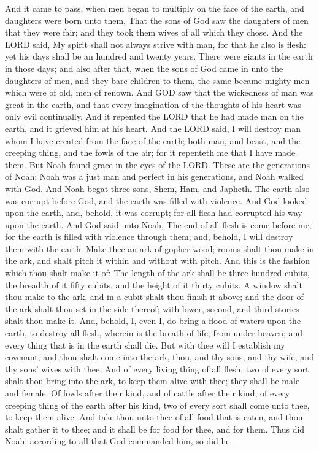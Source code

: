 \begin{biblechapter} %
\verse And it came to pass, when men began to multiply on the face of the earth, and daughters were born unto them,
\verse That the sons of God saw the daughters of men that they were fair; and they took them wives of all which they chose.
\verse And the LORD said, My spirit shall not always strive with man, for that he also is flesh: yet his days shall be an hundred and twenty years.
\verse There were giants in the earth in those days; and also after that, when the sons of God came in unto the daughters of men, and they bare children to them, the same became mighty men which were of old, men of renown.
\verse And GOD saw that the wickedness of man was great in the earth, and that every imagination of the thoughts of his heart was only evil continually.
\verse And it repented the LORD that he had made man on the earth, and it grieved him at his heart.
\verse And the LORD said, I will destroy man whom I have created from the face of the earth; both man, and beast, and the creeping thing, and the fowls of the air; for it repenteth me that I have made them.
\verse But Noah found grace in the eyes of the LORD.
\verse These are the generations of Noah: Noah was a just man and perfect in his generations, and Noah walked with God.
\verse And Noah begat three sons, Shem, Ham, and Japheth.
\verse The earth also was corrupt before God, and the earth was filled with violence.
\verse And God looked upon the earth, and, behold, it was corrupt; for all flesh had corrupted his way upon the earth.
\verse And God said unto Noah, The end of all flesh is come before me; for the earth is filled with violence through them; and, behold, I will destroy them with the earth.
\verse Make thee an ark of gopher wood; rooms shalt thou make in the ark, and shalt pitch it within and without with pitch.
\verse And this is the fashion which thou shalt make it of: The length of the ark shall be three hundred cubits, the breadth of it fifty cubits, and the height of it thirty cubits.
\verse A window shalt thou make to the ark, and in a cubit shalt thou finish it above; and the door of the ark shalt thou set in the side thereof; with lower, second, and third stories shalt thou make it.
\verse And, behold, I, even I, do bring a flood of waters upon the earth, to destroy all flesh, wherein is the breath of life, from under heaven; and every thing that is in the earth shall die.
\verse But with thee will I establish my covenant; and thou shalt come into the ark, thou, and thy sons, and thy wife, and thy sons' wives with thee.
\verse And of every living thing of all flesh, two of every sort shalt thou bring into the ark, to keep them alive with thee; they shall be male and female.
\verse Of fowls after their kind, and of cattle after their kind, of every creeping thing of the earth after his kind, two of every sort shall come unto thee, to keep them alive.
\verse And take thou unto thee of all food that is eaten, and thou shalt gather it to thee; and it shall be for food for thee, and for them.
\verse Thus did Noah; according to all that God commanded him, so did he.
\end{biblechapter}


